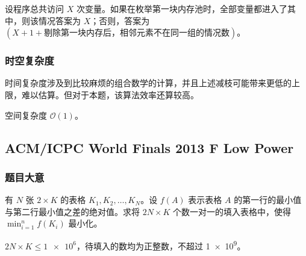 				设程序总共访问 $X$ 次变量。如果在枚举第一块内存池时，全部变量都进入了其中，则该情况答案为 $X$；否则，答案为 $(X + 1 + \text{剔除第一块内存后，相邻元素不在同一组的情况数})$。
			\subsubsection{时空复杂度}
				时间复杂度涉及到比较麻烦的组合数学的计算，并且上述减枝可能带来更低的上限，难以估算。但对于本题，该算法效率还算较高。
				
				空间复杂度 $\mathcal{O}\left(1\right)$。
				
		\newpage
		\subsection{ACM/ICPC World Finals 2013 F Low Power}
			\subsubsection{题目大意}
				有 $N$ 张 $2 \times K$ 的表格 $K_1,K_2, \ldots, K_N$。设 $f(A)$ 表示表格 $A$ 的第一行的最小值与第二行最小值之差的绝对值。求将 $2 N \times K$ 个数一对一的填入表格中，使得 $\textstyle \min_{i=1}^{n} f(K_i)$ 最小化。
				
				$2N \times K \le \num{1e6}$，待填入的数均为正整数，不超过 \num{1e9}。
